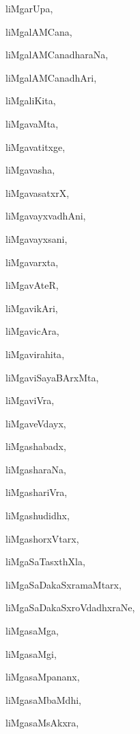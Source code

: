 \begin{multicols}{2}
{liMgarUpa}, \pageref{liMgarUpa}

{liMgalAMCana}, \pageref{liMgalAMCana}

{liMgalAMCanadharaNa}, \pageref{liMgalAMCanadharaNa}

{liMgalAMCanadhAri}, \pageref{liMgalAMCanadhAri}

{liMgaliKita}, \pageref{liMgaliKita}

{liMgavaMta}, \pageref{liMgavaMta}

{liMgavatitxge}, \pageref{liMgavatitxge}

{liMgavasha}, \pageref{liMgavasha}

{liMgavasatxrX}, \pageref{liMgavasatxrX}

{liMgavayxvadhAni}, \pageref{liMgavayxvadhAni}

{liMgavayxsani}, \pageref{liMgavayxsani}

{liMgavarxta}, \pageref{liMgavarxta}

{liMgavAteR}, \pageref{liMgavAteR}

{liMgavikAri}, \pageref{liMgavikAri}

{liMgavicAra}, \pageref{liMgavicAra}

{liMgavirahita}, \pageref{liMgavirahita}

{liMgaviSayaBArxMta}, \pageref{liMgaviSayaBArxMta}

{liMgaviVra}, \pageref{liMgaviVra}

{liMgaveVdayx}, \pageref{liMgaveVdayx}

{liMgashabadx}, \pageref{liMgashabadx}

{liMgasharaNa}, \pageref{liMgasharaNa}

{liMgashariVra}, \pageref{liMgashariVra}

{liMgashudidhx}, \pageref{liMgashudidhx}

{liMgashorxVtarx}, \pageref{liMgashorxVtarx}

{liMgaSaTasxthXla}, \pageref{liMgaSaTasxthXla}

{liMgaSaDakaSxramaMtarx}, \pageref{liMgaSaDakaSxramaMtarx}

{liMgaSaDakaSxroVdadhxraNe}, \pageref{liMgaSaDakaSxroVdadhxraNe}

{liMgasaMga}, \pageref{liMgasaMga}

{liMgasaMgi}, \pageref{liMgasaMgi}

{liMgasaMpananx}, \pageref{liMgasaMpananx}

{liMgasaMbaMdhi}, \pageref{liMgasaMbaMdhi}

{liMgasaMsAkxra}, \pageref{liMgasaMsAkxra}


\end{multicols}
